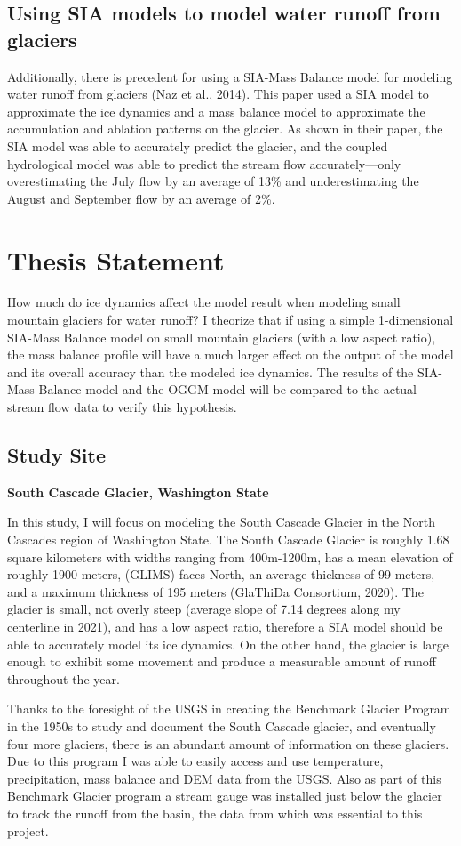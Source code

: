 \documentclass{article}
\begin{document}
\subsection{Using SIA models to model water runoff from glaciers}
    Additionally, there is precedent for using a SIA-Mass Balance model for modeling water runoff from glaciers (Naz et al., 2014). This paper used 
a SIA model to approximate the ice dynamics and a mass balance model to approximate the accumulation and ablation patterns on the glacier. 
As shown in their paper, the SIA model was able to accurately predict the glacier, and the coupled hydrological model was able to predict 
the stream flow accurately---only overestimating the July flow by an average of 13\% and underestimating the August and September flow by an 
average of 2\%.

\section{Thesis Statement}
How much do ice dynamics affect the model result when modeling small mountain glaciers for water runoff? I theorize that if using a simple 
1-dimensional SIA-Mass Balance model on small mountain glaciers (with a low aspect ratio), the mass balance profile will have a 
much larger effect on the output of the model and its overall accuracy than the modeled ice dynamics. The results of the SIA-Mass Balance 
model and the OGGM model will be compared to the actual stream flow data to verify this hypothesis.
\subsection{Study Site}
\textbf{\large South Cascade Glacier, Washington State}

In this study, I will focus on modeling the South Cascade Glacier in the North Cascades region of Washington State. The South Cascade Glacier is 
roughly 1.68 square kilometers with widths ranging from 400m-1200m, has a mean elevation of roughly 1900 meters, (GLIMS) faces North, an average thickness of 99 meters, and a 
maximum thickness of 195 meters (GlaThiDa Consortium, 2020). The glacier is small, not overly steep (average slope of 7.14 degrees along my 
centerline in 2021), and has a low aspect ratio, therefore a
SIA model should be able to accurately model its ice dynamics. On the other hand, the glacier is large enough to exhibit some movement 
and produce a measurable amount of runoff throughout the year. 

Thanks to the foresight of the USGS in creating the Benchmark Glacier Program in the 1950s to study and document the South Cascade glacier, 
and eventually four more glaciers, there is an abundant amount of information on these glaciers. Due to this program I was able to 
easily access and use temperature, precipitation, mass balance and DEM data from the USGS. Also as part of this Benchmark Glacier program a 
stream gauge was installed just below the glacier to track the runoff from the basin, the data from which was essential to this project.
\end{document}
